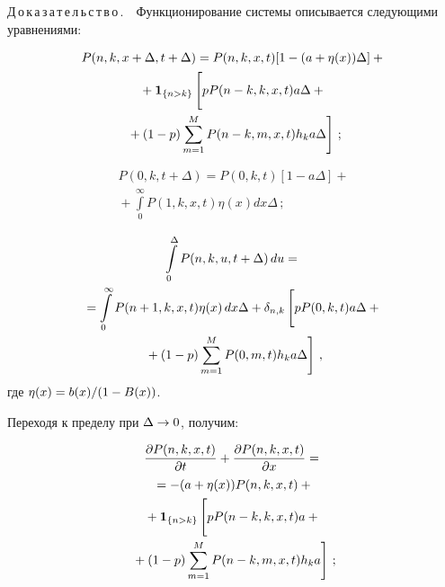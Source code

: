 \begin{multicols}{2}
\vspace*{-2pt}


\noindent
Д\,о\,к\,а\,з\,а\,т\,е\,л\,ь\,с\,т\,в\,о\,.\ \
Функционирование системы описывается следующими уравнениями:

\vspace*{-1pt}

\noindent
\begin{multline*}
P(n,k,x+\Delta,t+\Delta)=P(n,k,x,t)[1-(a+\eta(x))\Delta]+{}\\
{}+\mathbf{1}_{\{n>k\}}\left[
\vphantom{\sum\limits_{m=1}^{M}}
pP(n-k,k,x,t)a\Delta+{}\right.\\
\left.{}+(1-p)\sum\limits_{m=1}^{M}
P(n-k,m,x,t)h_k a\Delta\right]\,; %
\end{multline*}

\vspace*{-14pt}

\noindent
\begin{multline*}
P(0,k,t+\Delta)=P(0,k,t)[1-a\Delta]+{}\\
{}+\int\limits_0^{\infty}
P(1,k,x,t)\eta(x)dx\Delta\,; %
\end{multline*}

\vspace*{-16pt}

\noindent
\begin{multline*}
\int\limits_0^\Delta P(n,k,u,t+\Delta)\,du={}\\[-0.5pt]
{}=
\int\limits_0^{\infty}P(n+1,k,x,t)\eta(x)\,dx\Delta+
\delta_{n,k}\left[
\vphantom{\sum\limits_{m=1}^{M}}
pP(0,k,t)a\Delta+{}\right.\\[-0.5pt]
\left.{}+(1-p)\sum\limits_{m=1}^{M}
P(0,m,t)h_k a\Delta\right]\,,
\end{multline*}
где $\eta(x)\hm=b(x)/(1-B(x))$.

Переходя к пределу при $\Delta\hm\rightarrow0$, получим:

\noindent
\begin{multline}
\fr{\partial P(n,k,x,t)}{\partial t}+\fr{\partial P(n,k,x,t)}{\partial x}={}\\[-0.5pt]
{}=
-(a+\eta(x))P(n,k,x,t)+{}\\[-0.5pt]
{}+\mathbf{1}_{\{n>k\}}\left[
\vphantom{\sum\limits_{m=1}^{M}}
pP(n-k,k,x,t)a+{}\right.\\[-0.5pt]
\left.{}+(1-p)
\sum\limits_{m=1}^{M}P(n-k,m,x,t)h_k a\right]\,;\label{after1}
\end{multline}


\end{multicols}
